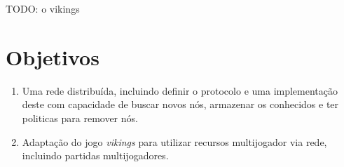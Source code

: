 TODO: o vikings

\section{Objetivos}
\label{sec:intr:objetivos}

\begin{enumerate}
  \item Uma rede distribuída, incluindo definir o protocolo e uma implementação deste com capacidade de 
    buscar novos nós, armazenar os conhecidos e ter politicas para remover nós.
    
  \item Adaptação do jogo \textit{vikings} para utilizar recursos multijogador via rede, incluindo partidas
    multijogadores.
\end{enumerate}





